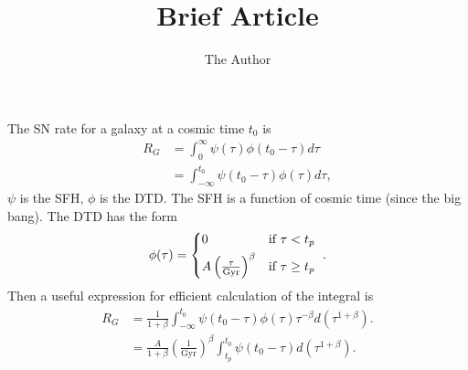 \documentclass[11pt, oneside]{article}   	%
\title{Brief Article}
\author{The Author}
\begin{document}
\maketitle
The SN rate for a galaxy at a cosmic time $t_0$ is
\begin{align}
R_G &= \int_{0}^{\infty} \psi(\tau) \phi(t_0-\tau) d\tau \\
 &= \int_{-\infty}^{t_0} \psi(t_0-\tau) \phi(\tau) d\tau,
\end{align}
$\psi$ is the SFH, $\phi$ is the DTD. 
The SFH is a function of cosmic time (since the big bang).
The DTD has the form
\begin{equation}
\phi(\tau) =  
\begin{cases*} 
            0  &  if $\tau < t_p$  \\
             A \left(\frac{\tau}{\mathrm{Gyr}} \right)^\beta  & if $\tau \geq t_p$ 
          \end{cases*}.
\end{equation}
Then a useful expression for efficient calculation of the integral is
\begin{align}
R_G &= \frac{1}{1+\beta}  \int_{-\infty}^{t_0} \psi(t_0-\tau)  \phi(\tau)\tau^{-\beta}  d(\tau^{1+\beta}). \\
 &= \frac{A}{1+\beta}  \left(\frac{1}{\mathrm{Gyr}} \right)^\beta \int_{t_p}^{t_0} \psi(t_0-\tau) d(\tau^{1+\beta}).
 \end{align}
\end{document}
